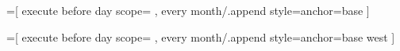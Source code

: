 =[%
  execute before day scope={%
    },
  every month/.append style={anchor=base}
]
  
=[%
  execute before day scope={%
    },
  every month/.append style={anchor=base west}
]



%
%

\def\tikz@lib@cal@calendar{%
  \begingroup%
    \let\tikz@lib@cal@ifs=\pgfutil@empty%
    \tikz@expandcount=1000\relax%
    \tikzset{name=,at={(0,0)}}%
    \let\%=\pgfcalendarshorthand%
    \tikzset{every calendar/.try}%
    \tikz@lib@cal@scanner%
}

\def\tikz@lib@cal@scanner{%
  \afterassignment\tikz@lib@cal@handle\let\pgf@let@token=%
}

\def\tikz@lib@cal@handle{%
  \let\@next=\tikz@lib@cal@expand%
  \ifx\pgf@let@token;%
    \let\@next=\tikz@lib@cal@stop%
  \else%
    \ifx\pgf@let@token(%
      \let\@next=\tikz@lib@cal@name%
    \else%
      \ifx\pgf@let@token a%
        \let\@next=\tikz@lib@cal@at%
      \else%
        \ifx\pgf@let@token[%
          \let\@next=\tikz@lib@cal@option%
        \else%
          \ifx\pgf@let@token i%
            \let\@next=\tikz@lib@cal@if%
          \fi%
        \fi%
      \fi%
    \fi%
  \fi%
  \@next%
}
\def\tikz@lib@cal@expand{%
  \advance\tikz@expandcount by -1%
  \ifnum\tikz@expandcount<0\relax%
    \tikzerror{Giving up on this calendar}%
    \let\@next=\tikz@lib@cal@end%
  \else%
    \let\@next=\tikz@lib@cal@@expand
  \fi%
  \@next}

\def\tikz@lib@cal@@expand{\expandafter\tikz@lib@cal@scanner\pgf@let@token}


\def\tikz@lib@cal@name#1){%
  \tikzset{name=#1}%
  \tikz@lib@cal@scanner%
}
\def\tikz@lib@cal@at t#1(#2){%
  \tikzset{at={(#2)}}%
  \tikz@lib@cal@scanner%
}
\def\tikz@lib@cal@option#1]{%
  \tikzset{#1}%
  \tikz@lib@cal@scanner%
}
\def\tikz@lib@cal@if f#1(#2){%
  \pgfutil@ifnextchar[{\tikz@lib@cal@if@opt{#2}}{\tikz@lib@cal@if@code{#2}}}%

